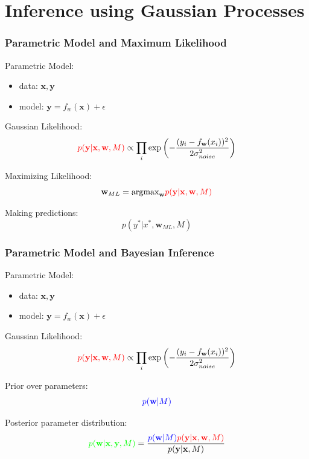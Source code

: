 \documentclass[10pt]{beamer}
\newcommand{\bx}{\mathbf{x}}
\newcommand{\by}{\mathbf{y}}
\newcommand{\bw}{\mathbf{w}}
\newcommand{\argmax}{\text{argmax}}
\begin{document}
  \section{Inference using Gaussian Processes}

  \begin{frame}
    \frametitle{Parametric Model and Maximum Likelihood}
    Parametric Model:
      \begin{itemize}
        \item data: $\bx, \by$
        \item model: $\by = f_w(\bx) + \epsilon$
      \end{itemize}

    \pause

    Gaussian Likelihood:
      \begin{equation*}
        \textcolor{red}{p(\by|\bx, \bw, M)} \propto \prod_i \exp \left( - \frac{ (y_i - f_{\bw}(x_i))^2}{2 \sigma_{noise}^2} \right)
      \end{equation*}

    \pause

    Maximizing Likelihood:
      \begin{equation*}
        \bw_{ML} = \argmax_{\bw} \textcolor{red}{p(\by|\bx,\bw,M)}
      \end{equation*}

    \pause

    Making predictions:
      \begin{equation*}
        p(y^*|x^*,\bw_{ML},M)
      \end{equation*}
  \end{frame}

  \begin{frame}
    \frametitle{Parametric Model and Bayesian Inference}
    Parametric Model:
      \begin{itemize}
        \item data: $\bx, \by$
        \item model: $\by = f_w(\bx) + \epsilon$
      \end{itemize}

    \pause

    Gaussian Likelihood:
      \begin{equation*}
        \textcolor{red}{p(\by|\bx, \bw, M)} \propto \prod_i \exp \left( - \frac{ (y_i - f_{\bw}(x_i))^2}{2 \sigma_{noise}^2} \right)
      \end{equation*}

    \pause

    Prior over parameters:
      \begin{equation*}
        \textcolor{blue}{p(\bw|M)}
      \end{equation*}

    \pause

    Posterior parameter distribution:
      \begin{equation*}
        \textcolor{green}{p(\bw|\bx,\by,M)} = \frac{\textcolor{blue}{p(\bw|M)} \textcolor{red}{p(\by|\bx, \bw, M)}}{p(\by|\bx,M)}
      \end{equation*}
  \end{frame}
\end{document}
